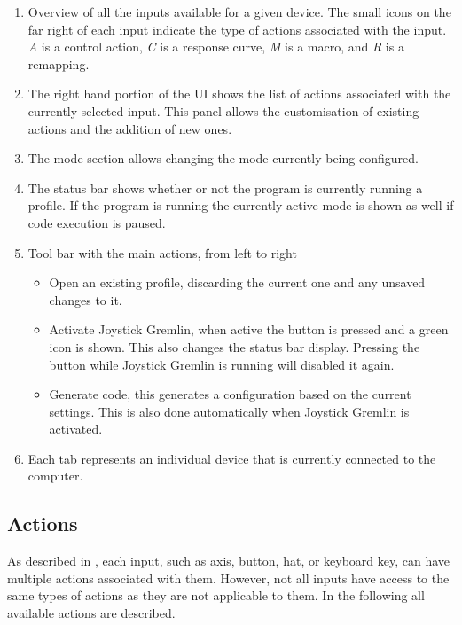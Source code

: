 \documentclass[a4, 10pt]{article}
\newcommand{\JG}{Joystick Gremlin}
\begin{document}
\begin{enumerate}
    \item Overview of all the inputs available for a given device. The
        small icons on the far right of each input indicate the type of
        actions associated with the input. \emph{A} is a control action,
        \emph{C} is a response curve, \emph{M} is a macro, and \emph{R} is
        a remapping.
    \item The right hand portion of the UI shows the list of actions
        associated with the currently selected input. This panel allows
        the customisation of existing actions and the addition of new
        ones.
    \item The mode section allows changing the mode currently being
        configured.
    \item The status bar shows whether or not the program is currently
        running a profile. If the program is running the currently
        active mode is shown as well if code execution is paused.
    \item Tool bar with the main actions, from left to right
        \begin{itemize}
            \item Open an existing profile, discarding the current one
                and any unsaved changes to it.
            \item Activate \JG{}, when active the button is pressed and
                a green icon is shown. This also changes the status bar
                display. Pressing the button while \JG{} is running
                will disabled it again.
            \item Generate code, this generates a configuration based on
                the current settings. This is also done automatically
                when \JG{} is activated.
        \end{itemize}
    \item Each tab represents an individual device that is currently
        connected to the computer.
\end{enumerate}


\subsection{Actions}

As described in , each input, such as axis, button,
hat, or keyboard key, can have multiple actions associated with them.
However, not all inputs have access to the same types of actions as they
are not applicable to them. In the following all available actions are
described.
\end{document}
